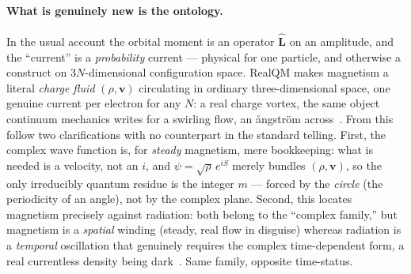 \documentclass[11pt]{article}
\begin{document}
\paragraph{What is genuinely new is the ontology.} In the usual account the orbital moment is an operator
$\hat{\mathbf L}$ on an amplitude, and the ``current'' is a \emph{probability} current --- physical for one
particle, and otherwise a construct on $3N$-dimensional configuration space. RealQM makes magnetism a literal
\emph{charge fluid} $(\rho,\mathbf v)$ circulating in ordinary three-dimensional space, one genuine current per
electron for any $N$: a real charge vortex, the same object continuum mechanics writes for a swirling flow, an
\aa ngstr\"om across~\cite{RealQM}. From this follow two clarifications with no counterpart in the standard
telling. First, the complex wave function is, for \emph{steady} magnetism, mere bookkeeping: what is needed is a
velocity, not an $i$, and $\psi=\sqrt\rho\,e^{iS}$ merely bundles $(\rho,\mathbf v)$, so the only irreducibly
quantum residue is the integer $m$ --- forced by the \emph{circle} (the periodicity of an angle), not by the
complex plane. Second, this locates magnetism precisely against radiation: both belong to the ``complex family,''
but magnetism is a \emph{spatial} winding (steady, real flow in disguise) whereas radiation is a \emph{temporal}
oscillation that genuinely requires the complex time-dependent form, a real currentless density being
dark~\cite{Spectra}. Same family, opposite time-status.
\end{document}
